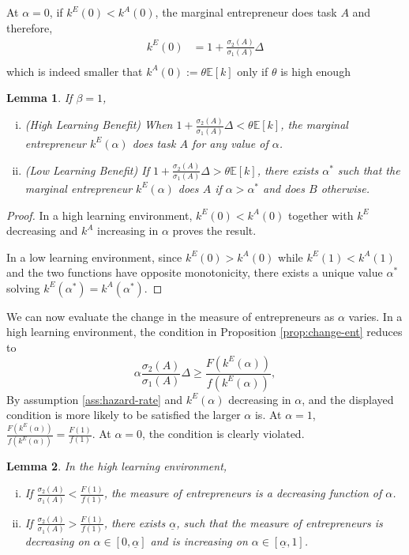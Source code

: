 \documentclass[12pt]{article}
\newtheorem{lemma}{Lemma}
\newcommand{\E}[1]{\mathbb E[#1]}
\begin{document}
At $\alpha=0$, if $k^E(0)<k^A(0)$, the marginal entrepreneur does task $A$ and therefore,
\begin{align*}
    k^E(0)&=1+\frac{\sigma_2(A)}{\sigma_1(A)}\Delta\\ 
\end{align*}
which is indeed smaller that $k^A(0):=\theta \E k$ only if $\theta$ is high enough
%
\begin{lemma}\label{lem:beta=1}
    If $\beta=1$, 
    \begin{enumerate}[(i)]
        \item (High Learning Benefit) When $1+\frac{\sigma_2(A)}{\sigma_1(A)}\Delta<\theta \E k$, the marginal entrepreneur $k^E(\alpha)$ does task $A$ for any value of $\alpha$.
        \item (Low Learning Benefit) If $1+\frac{\sigma_2(A)}{\sigma_1(A)}\Delta>\theta \E k$, there exists $\alpha^*$ such that the marginal entrepreneur $k^E(\alpha)$ does $A$ if $\alpha>\alpha^*$ and does $B$ otherwise.
    \end{enumerate}
\end{lemma}
%
\begin{proof}
    In a high learning environment, $k^E(0)<k^A(0)$ together with $k^E$ decreasing and $k^A$ increasing in $\alpha$ proves the result.

    In a low learning environment, since $k^E(0)>k^A(0)$ while $k^E(1)<k^A(1)$ and the two functions have opposite monotonicity, there exists a unique value $\alpha^*$ solving $k^E(\alpha^*)= k^A(\alpha^*)$. 
\end{proof}
We can now evaluate the change in the measure of entrepreneurs as $\alpha$ varies. In a high learning environment, the condition in Proposition \ref{prop:change-ent} reduces to
%
\[
\alpha \frac{\sigma_2(A)}{\sigma_1(A)}\Delta \geq \frac{F(k^E(\alpha))}{f(k^E(\alpha))}, 
\]
%
By assumption \ref{ass:hazard-rate} and $k^E(\alpha)$ decreasing in $\alpha$, and the displayed condition is more likely to be satisfied the larger $\alpha$ is. At $\alpha=1$, $\frac{F(k^E(\alpha))}{f(k^E(\alpha))}=\frac{F(1)}{f(1)}$. At $\alpha=0$, the condition is clearly violated.
\begin{lemma}
    In the high learning environment,
    \begin{enumerate}[(i)]
        \item If $\frac{\sigma_2(A)}{\sigma_1(A)}<\frac{F(1)}{f(1)}$, the measure of entrepreneurs is a decreasing function of $\alpha$.
        \item If $\frac{\sigma_2(A)}{\sigma_1(A)}>\frac{F(1)}{f(1)}$, there exists $\underline \alpha$, such that the measure of entrepreneurs is decreasing on $\alpha\in[0,\underline \alpha]$ and is increasing on $\alpha\in [\underline \alpha,1]$. 
    \end{enumerate}
\end{lemma}
\end{document}

